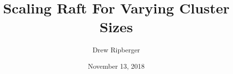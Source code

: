 \documentclass[11pt, twocolumn]{article}
\title{Scaling Raft For Varying Cluster Sizes}
\author{Drew Ripberger}
\date{November 13, 2018}
\begin{document}
  \maketitle
  \textbf{}
  
  
  
  
\end{document}
